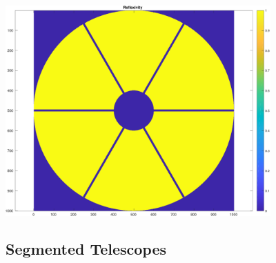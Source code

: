 \documentclass[12pt]{article}
\begin{document}
\includegraphics [width=4in]{docuPupilClass_05.pdf}


\subsection*{Segmented Telescopes}
\end{document}
